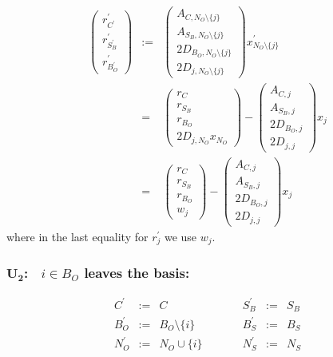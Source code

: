 \documentclass[a4paper]{article}
\begin{document}
\begin{eqnarray}
\left(
\begin{array}{c}
r_{C^{\prime}}^{\prime} \\
\hline
r_{S_{B}^{\prime}}^{\prime} \\
\hline
r_{B_{O}^{\prime}}^{\prime}
\end{array}
\right)
&:=&
\left(
\begin{array}{c}
A_{C, N_{O} \setminus \{j\}} \\
\hline
A_{S_{B}, N_{O} \setminus \{j\}} \\
\hline
2D_{B_{O}, N_{O} \setminus \{j\}} \\
\hline
2D_{j, N_{O} \setminus \{j\}} 
\end{array}
\right)
x_{N_{O} \setminus \{j\}}^{\prime} 
\nonumber \\
&=&
\left(
\begin{array}{c}
r_{C} \\
\hline
r_{S_{B}} \\
\hline
r_{B_{O}} \\
\hline
2D_{j, N_{O}}x_{N_{O}}
\end{array}
\right)
-
\left(
\begin{array}{c}
A_{C, j} \\
\hline
A_{S_{B}, j} \\
\hline
2D_{B_{O}, j} \\
\hline
2D_{j, j}
\end{array}
\right)
x_{j}
\nonumber \\
&=&
\left(
\begin{array}{c}
r_{C} \\
\hline
r_{S_{B}} \\
\hline
r_{B_{O}} \\
\hline
w_{j}
\end{array}
\right)
-
\left(
\begin{array}{c}
A_{C, j} \\
\hline
A_{S_{B}, j} \\
\hline
2D_{B_{O}, j} \\
\hline
2D_{j, j}
\end{array}
\right)
x_{j}
\end{eqnarray}
where in the last equality for $r_{j}^{\prime}$ we use $w_{j}$. 

\subsubsection{$\mathbf{U_{2}}$:$\quad i \in B_{O}$ leaves the basis:}
\begin{equation}
\label{update:original_leaves_basis}
\begin{array}{ccccccc}
C^{\prime}      &:=&  C
&\quad\quad&
S_{B}^{\prime}  &:=&  S_{B}   \\
B_{O}^{\prime}  &:=&  B_{O} \setminus \{i\}
&\quad\quad&
B_{S}^{\prime}  &:=&  B_{S}   \\
N_{O}^{\prime}  &:=&  N_{O} \cup \{i\}
&\quad\quad&
N_{S}^{\prime}  &:=&  N_{S} 
\end{array}
\end{equation}
\end{document}
